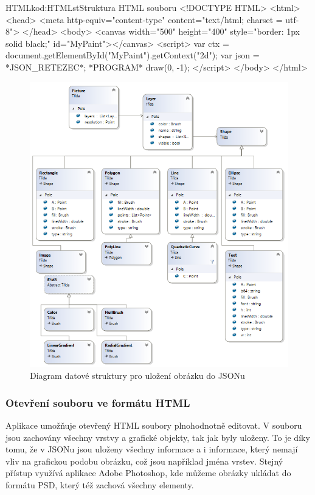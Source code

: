\documentclass[
  field=inf,
  biblatex,
  glossaries,
  index
]{kidiplom}
\begin{document}
\begin{kicode}{HTML}{kod:HTMLst}{Struktura HTML souboru}
<!DOCTYPE HTML>
<html>
  <head>
    <meta http-equiv="content-type" content="text/html; charset = utf-8">
  </head>
  <body>
  <canvas width="500" height="400" style="border: 1px solid black;" id="MyPaint"></canvas>
  <script>
    var ctx = document.getElementById("MyPaint").getContext("2d");
    var json = *JSON_RETEZEC*;
    *PROGRAM*
    draw(0, -1);
  </script>
  </body>
</html>
\end{kicode}


\begin{figure}
\includegraphics[width=15cm]{img/json_diag}
\caption{Diagram datové struktury pro uložení obrázku do JSONu}
\label{fig:json_diag}
\end{figure} 


\subsubsection{Otevření souboru ve formátu HTML}
Aplikace umožňuje otevřený HTML soubory plnohodnotně editovat. V souboru jsou zachovány všechny vrstvy a grafické objekty, tak jak byly uloženy. To je díky tomu, že v JSONu jsou uloženy všechny informace a i informace, který nemají vliv na grafickou podobu obrázku, což jsou například jména vrstev. Stejný přístup využívá aplikace Adobe Photoshop, kde můžeme obrázky ukládat do formátu PSD, který též zachová všechny elementy.
\end{document}
